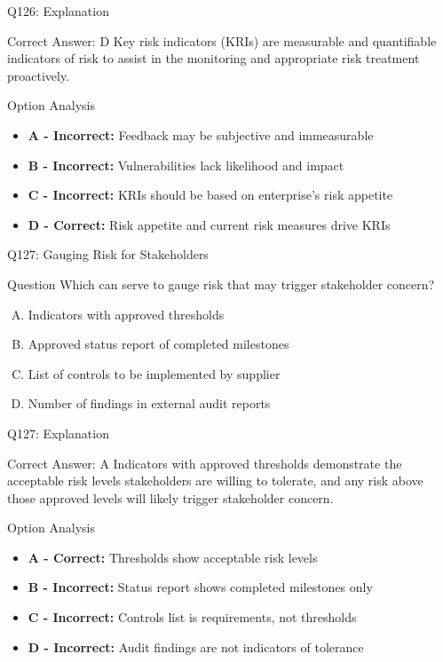 \documentclass{beamer}
\begin{document}
	\begin{frame}{Q126: Explanation}
		\begin{block}{Correct Answer: D}
			Key risk indicators (KRIs) are measurable and quantifiable indicators of risk to assist in the monitoring and appropriate risk treatment proactively.
		\end{block}
		\begin{block}{Option Analysis}
			\begin{itemize}
				\item \textbf{A - Incorrect:} Feedback may be subjective and immeasurable
				\item \textbf{B - Incorrect:} Vulnerabilities lack likelihood and impact
				\item \textbf{C - Incorrect:} KRIs should be based on enterprise's risk appetite
				\item \textbf{D - Correct:} Risk appetite and current risk measures drive KRIs
			\end{itemize}
		\end{block}
	\end{frame}
	
	\begin{frame}{Q127: Gauging Risk for Stakeholders}
		\begin{block}{Question}
			Which can serve to gauge risk that may trigger stakeholder concern?
		\end{block}
		\begin{enumerate}[(A)]
			\item Indicators with approved thresholds
			\item Approved status report of completed milestones
			\item List of controls to be implemented by supplier
			\item Number of findings in external audit reports
		\end{enumerate}
	\end{frame}
	
	\begin{frame}{Q127: Explanation}
		\begin{block}{Correct Answer: A}
			Indicators with approved thresholds demonstrate the acceptable risk levels stakeholders are willing to tolerate, and any risk above those approved levels will likely trigger stakeholder concern.
		\end{block}
		\begin{block}{Option Analysis}
			\begin{itemize}
				\item \textbf{A - Correct:} Thresholds show acceptable risk levels
				\item \textbf{B - Incorrect:} Status report shows completed milestones only
				\item \textbf{C - Incorrect:} Controls list is requirements, not thresholds
				\item \textbf{D - Incorrect:} Audit findings are not indicators of tolerance
			\end{itemize}
		\end{block}
	\end{frame}
	
\end{document}
